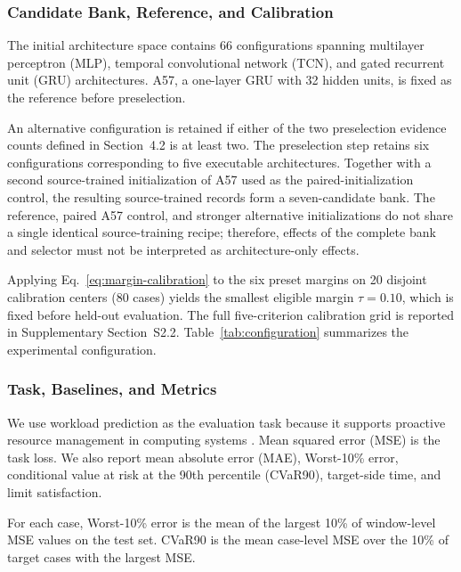\documentclass[a4paper,fleqn]{cas-sc}
\begin{document}
\subsubsection{Candidate Bank, Reference, and Calibration}
\label{subsubsec:bank-calibration}

The initial architecture space contains 66 configurations spanning multilayer
perceptron (MLP), temporal convolutional network (TCN), and gated recurrent
unit (GRU) architectures. A57, a one-layer GRU with 32 hidden units, is fixed
as the reference before preselection.

An alternative configuration is retained if either of the two preselection
evidence counts defined in Section~4.2 is at least two. The preselection step retains six configurations corresponding to five executable
architectures. Together with a second source-trained initialization of A57 used
as the paired-initialization control, the resulting source-trained records form
a seven-candidate bank. The reference, paired A57 control, and stronger
alternative initializations do not share a single identical source-training
recipe; therefore, effects of the complete bank and selector must not be
interpreted as architecture-only effects.

Applying Eq.~\eqref{eq:margin-calibration} to the six preset margins on
20 disjoint calibration centers (80 cases) yields the smallest eligible
margin $\tau=0.10$, which is fixed before held-out evaluation. The full
five-criterion calibration grid is reported in Supplementary Section~S2.2.
Table~\ref{tab:configuration} summarizes the experimental configuration.



\subsubsection{Task, Baselines, and Metrics}

We use workload prediction as the evaluation task because it supports
proactive resource management in computing systems
\cite{ref17,ref18,ref19}. Mean squared error (MSE) is the task loss. We also
report mean absolute error (MAE), Worst-10\% error, conditional value at risk
at the 90th percentile (CVaR90), target-side time, and limit satisfaction.

For each case, Worst-10\% error is the mean of the largest 10\% of window-level
MSE values on the test set. CVaR90 is the mean case-level MSE over the 10\% of
target cases with the largest MSE.
\end{document}
